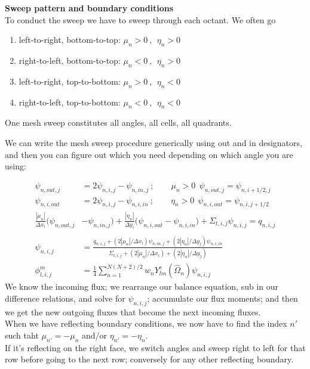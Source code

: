 \documentclass[12pt]{article}
\newcommand{\vOmega}{\ensuremath{\hat{\Omega}}}
\begin{document}
\textbf{Sweep pattern and boundary conditions}\\
To conduct the sweep we have to sweep through each octant. We often go
\begin{enumerate}
\item left-to-right, bottom-to-top: $\mu_n > 0\:, \:\: \eta_n > 0$
\item right-to-left, bottom-to-top: $\mu_n < 0\:, \:\: \eta_n > 0$
\item left-to-right, top-to-bottom: $\mu_n > 0\:, \:\: \eta_n < 0$
\item right-to-left, top-to-bottom: $\mu_n < 0\:, \:\: \eta_n < 0$
\end{enumerate}
One mesh sweep constitutes all angles, all cells, all quadrants. 

We can write the mesh sweep procedure generically using out and in designators, and then you can figure out which you need depending on which angle you are using:

\begin{align*}
\psi_{n,out,j} &= 2\psi_{n,i,j} - \psi_{n,in,j}\:; \qquad \mu_n > 0\:\:\psi_{n,out,j} = \psi_{n,i+1/2,j} \\
\psi_{n,i,out} &= 2\psi_{n,i,j} - \psi_{n,i,in}\:; \qquad \eta_n > 0\:\:\psi_{n,i,out} = \psi_{n,i,j+1/2}\\
\frac{|\mu_n|}{\Delta x_i}\bigl(\psi_{n,out,j} &- \psi_{n,in,j}\bigr) + \frac{|\eta_n|}{\Delta y_i}\bigl(\psi_{n,i,out} - \psi_{n,i,in}\bigr) + \Sigma_{t,i,j} \psi_{n,i,j} = q_{n,i,j}\\
&\\
\psi_{n,i,j} &= \frac{q_{n,i,j} + (2|\mu_n| / \Delta x_i) \psi_{n,in,j} + (2|\eta_n| / \Delta y_j) \psi_{n,i,in}}{\Sigma_{t,i,j} + (2|\mu_n| / \Delta x_i) + (2|\eta_n| / \Delta y_j)}\\
\phi_{l,i,j}^m &= \frac{1}{4}\sum_{n=1}^{N(N+2)/2} w_n Y_{lm}^e(\vOmega_n) \psi_{n,i,j}
\end{align*}
We know the incoming flux; we rearrange our balance equation, sub in our difference relations, and solve for $\psi_{n,i,j}$; accumulate our flux moments; and then we get the new outgoing fluxes that become the next incoming fluxes.\\

When we have reflecting boundary conditions, we now have to find the index $n'$ such taht $\mu_{n'} = -\mu_n$ and/or $\eta_{n'} = -\eta_n$. \\
If it's reflecting on the right face, we switch angles and sweep right to left for that row before going to the next row; conversely for any other reflecting boundary. 
\end{document}
